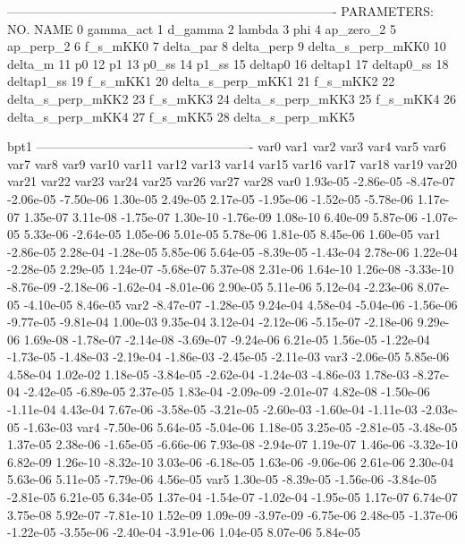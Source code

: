 -------------------------------------------------------------------------------
 PARAMETERS:
    NO.   NAME      
     0 gamma_act    
     1 d_gamma      
     2 lambda      
     3 phi         
     4 ap_zero_2   
     5 ap_perp_2   
     6 f_s_mKK0    
     7 delta_par  
     8 delta_perp 
     9 delta_s_perp_mKK0 
    10 delta_m      
    11 p0          
    12 p1          
    13 p0_ss       
    14 p1_ss       
    15 deltap0    
    16 deltap1    
    17 deltap0_ss 
    18 deltap1_ss 
    19 f_s_mKK1   
    20 delta_s_perp_mKK1 
    21 f_s_mKK2    
    22 delta_s_perp_mKK2 
    23 f_s_mKK3    
    24 delta_s_perp_mKK3 
    25 f_s_mKK4    
    26 delta_s_perp_mKK4 
    27 f_s_mKK5    
    28 delta_s_perp_mKK5 


bpt1
----------------------------------------------------
var0 var1 var2 var3 var4 var5 var6 var7 var8 var9 var10 var11 var12 var13 var14 var15 var16 var17 var18 var19 var20 var21 var22 var23 var24 var25 var26 var27 var28 
var0  1.93e-05 -2.86e-05 -8.47e-07 -2.06e-05 -7.50e-06  1.30e-05  2.49e-05  2.17e-05 -1.95e-06 -1.52e-05 -5.78e-06  1.17e-07  1.35e-07  3.11e-08 -1.75e-07  1.30e-10 -1.76e-09  1.08e-10  6.40e-09  5.87e-06 -1.07e-05  5.33e-06 -2.64e-05  1.05e-06  5.01e-05  5.78e-06  1.81e-05  8.45e-06  1.60e-05
var1 -2.86e-05  2.28e-04 -1.28e-05  5.85e-06  5.64e-05 -8.39e-05 -1.43e-04  2.78e-06  1.22e-04 -2.28e-05  2.29e-05  1.24e-07 -5.68e-07  5.37e-08  2.31e-06  1.64e-10  1.26e-08 -3.33e-10 -8.76e-09 -2.18e-06 -1.62e-04 -8.01e-06  2.90e-05  5.11e-06  5.12e-04 -2.23e-06  8.07e-05 -4.10e-05  8.46e-05
var2 -8.47e-07 -1.28e-05  9.24e-04  4.58e-04 -5.04e-06 -1.56e-06 -9.77e-05 -9.81e-04  1.00e-03  9.35e-04  3.12e-04 -2.12e-06 -5.15e-07 -2.18e-06  9.29e-06  1.69e-08 -1.78e-07 -2.14e-08 -3.69e-07 -9.24e-06  6.21e-05  1.56e-05 -1.22e-04 -1.73e-05 -1.48e-03 -2.19e-04 -1.86e-03 -2.45e-05 -2.11e-03
var3 -2.06e-05  5.85e-06  4.58e-04  1.02e-02  1.18e-05 -3.84e-05 -2.62e-04 -1.24e-03 -4.86e-03  1.78e-03 -8.27e-04 -2.42e-05 -6.89e-05  2.37e-05  1.83e-04 -2.09e-09 -2.01e-07  4.82e-08 -1.50e-06 -1.11e-04  4.43e-04  7.67e-06 -3.58e-05 -3.21e-05 -2.60e-03 -1.60e-04 -1.11e-03 -2.03e-05 -1.63e-03
var4 -7.50e-06  5.64e-05 -5.04e-06  1.18e-05  3.25e-05 -2.81e-05 -3.48e-05  1.37e-05  2.38e-06 -1.65e-05 -6.66e-06  7.93e-08 -2.94e-07  1.19e-07  1.46e-06 -3.32e-10  6.82e-09  1.26e-10 -8.32e-10  3.03e-06 -6.18e-05  1.63e-06 -9.06e-06  2.61e-06  2.30e-04  5.63e-06  5.11e-05 -7.79e-06  4.56e-05
var5  1.30e-05 -8.39e-05 -1.56e-06 -3.84e-05 -2.81e-05  6.21e-05  6.34e-05  1.37e-04 -1.54e-07 -1.02e-04 -1.95e-05  1.17e-07  6.74e-07  3.75e-08  5.92e-07 -7.81e-10  1.52e-09  1.09e-09 -3.97e-09 -6.75e-06  2.48e-05 -1.37e-06 -1.22e-05 -3.55e-06 -2.40e-04 -3.91e-06  1.04e-05  8.07e-06  5.84e-05
